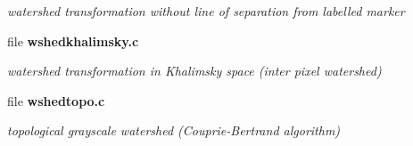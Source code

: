 \begin{DoxyCompactItemize}
\begin{DoxyCompactList}\small\item\em watershed transformation without line of separation from labelled marker \item\end{DoxyCompactList}

\item 
file {\bf wshedkhalimsky.c}


\begin{DoxyCompactList}\small\item\em watershed transformation in Khalimsky space (inter pixel watershed) \item\end{DoxyCompactList}

\item 
file {\bf wshedtopo.c}


\begin{DoxyCompactList}\small\item\em topological grayscale watershed (Couprie-\/Bertrand algorithm) \item\end{DoxyCompactList}

\end{DoxyCompactItemize}

